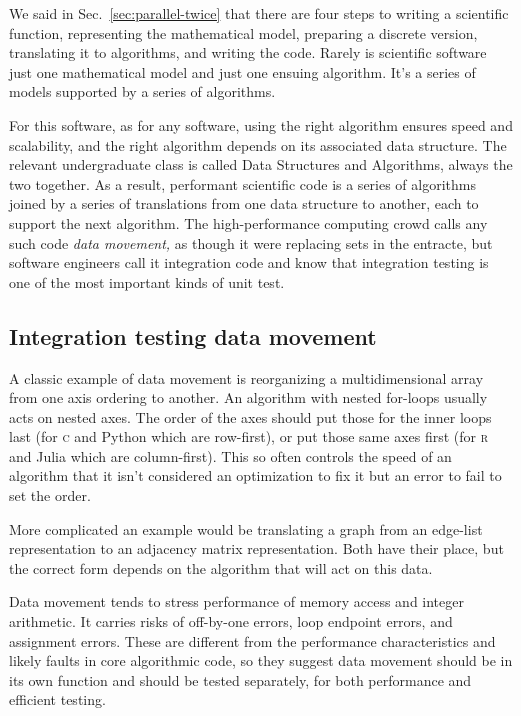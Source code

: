 \documentclass[fleqn,10pt]{olplainarticle}
\newcommand{\rlang}{\textsc{r}\xspace}
\begin{document}
We said in Sec.~\ref{sec:parallel-twice} that there are four
steps to writing a scientific function, representing the mathematical model,
preparing a discrete version, translating it to algorithms,
and writing the code.
Rarely is scientific software just one mathematical model
and just one ensuing algorithm. It's a series of models supported
by a series of algorithms.

For this software, as for any software, using the right algorithm
ensures speed and scalability, and the right algorithm depends on
its associated data structure. The relevant undergraduate class
is called Data Structures and Algorithms, always the two together.
As a result, performant scientific code is a series of algorithms
joined by a series of translations from one data structure to
another, each to support the next algorithm. The high-performance
computing crowd calls any such code \emph{data movement,} as though
it were replacing sets in the entracte,
but software engineers call it integration code and know that
integration testing is one of the most important kinds of unit test.


\subsection{Integration testing data movement}

A classic example of data movement is reorganizing a multidimensional
array from one axis ordering to another. An algorithm with nested
for-loops usually acts on nested axes. The order of the axes should
put those for the inner loops last (for \textsc{c} and Python which are row-first), or put those
same axes first (for \rlang and Julia which are column-first). This so
often controls the speed of an algorithm that it isn't considered an 
optimization to fix it but an error to fail to set the order.

More complicated an example would be translating a graph from
an edge-list representation to an adjacency matrix representation.
Both have their place, but the correct form depends on the
algorithm that will act on this data.

Data movement tends to stress performance of memory access
and integer arithmetic. It carries risks of off-by-one errors,
loop endpoint errors, and assignment errors. These are different
from the performance characteristics and likely faults in core
algorithmic code, so they suggest data movement should be in its
own function and should be tested separately, for both performance
and efficient testing.
\end{document}
